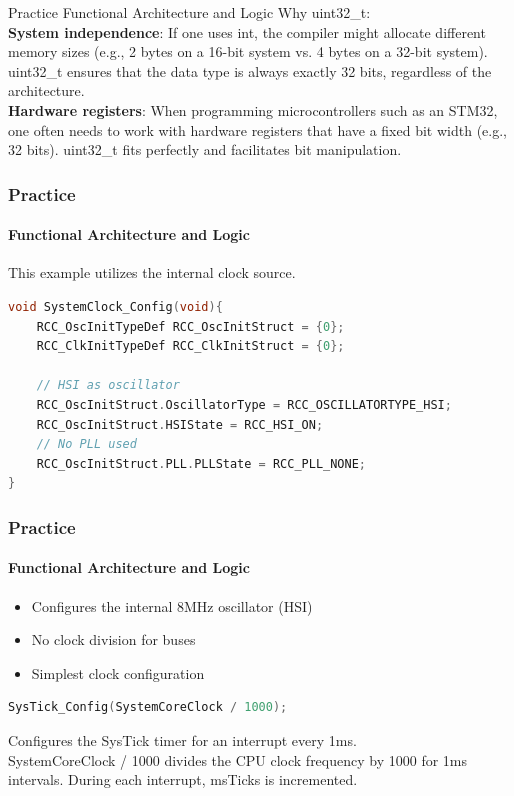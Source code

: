 \documentclass{beamer}
\begin{document}
\begin{frame}{Practice}
	{Functional Architecture and Logic}
	Why uint32\_t:\\
	\textbf{System independence}: If one uses int, the compiler might allocate different memory sizes (e.g., 2 bytes on a 16-bit system vs. 4 bytes on a 32-bit system). uint32\_t ensures that the data type is always exactly 32 bits, regardless of the architecture.\\
	\vspace{0.2cm}
	\textbf{Hardware registers}: When programming microcontrollers such as an STM32, one often needs to work with hardware registers that have a fixed bit width (e.g., 32 bits). uint32\_t fits perfectly and facilitates bit manipulation.\\
\end{frame}
\begin{frame}[fragile]
	\frametitle{Practice}
	\framesubtitle{Functional Architecture and Logic}
	This example utilizes the internal clock source.
	\begin{lstlisting}[language=C]
void SystemClock_Config(void){
	RCC_OscInitTypeDef RCC_OscInitStruct = {0};
	RCC_ClkInitTypeDef RCC_ClkInitStruct = {0};
			
	// HSI as oscillator
	RCC_OscInitStruct.OscillatorType = RCC_OSCILLATORTYPE_HSI;
	RCC_OscInitStruct.HSIState = RCC_HSI_ON;
	// No PLL used
	RCC_OscInitStruct.PLL.PLLState = RCC_PLL_NONE;
}
	\end{lstlisting}
\end{frame}
\begin{frame}[fragile]
	\frametitle{Practice}
	\framesubtitle{Functional Architecture and Logic}
	\begin{itemize}
		\item Configures the internal 8MHz oscillator (HSI)
		\item No clock division for buses
		\item Simplest clock configuration
	\end{itemize}
	\begin{lstlisting}[language=C]
SysTick_Config(SystemCoreClock / 1000);
	\end{lstlisting}
	Configures the SysTick timer for an interrupt every 1ms.\\
	SystemCoreClock / 1000 divides the CPU clock frequency by 1000 for 1ms intervals. During each interrupt, msTicks is incremented.
\end{frame}
\end{document}
